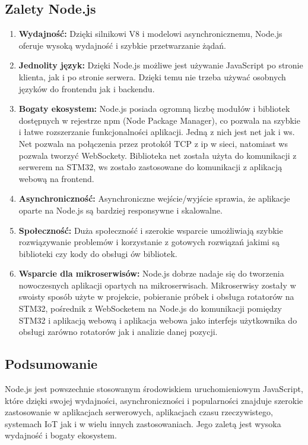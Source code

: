 \subsection{Zalety Node.js}
\begin{enumerate}
    \item \textbf{Wydajność:} Dzięki silnikowi V8 i modelowi asynchronicznemu, Node.js oferuje wysoką wydajność i szybkie przetwarzanie żądań.
    \item \textbf{Jednolity język:} Dzięki Node.js możliwe jest używanie JavaScript po stronie klienta, jak i po stronie serwera. Dzięki temu nie trzeba używać osobnych języków do frontendu jak i backendu.
    \item \textbf{Bogaty ekosystem:} Node.js posiada ogromną liczbę modułów i bibliotek dostępnych w rejestrze npm (Node Package Manager), co pozwala na szybkie i łatwe rozszerzanie funkcjonalności aplikacji. Jedną z nich jest net jak i ws. Net pozwala na połączenia przez  protokół TCP z ip w sieci, natomiast ws pozwala tworzyć WebSockety. Biblioteka net została użyta do komunikacji z serwerem na STM32, ws zostało zastosowane do komunikacji z aplikacją webową na frontend.
    \item \textbf{Asynchroniczność:} Asynchroniczne wejście/wyjście sprawia, że aplikacje oparte na Node.js są bardziej responsywne i skalowalne.
    \item \textbf{Społeczność:} Duża społeczność i szerokie wsparcie umożliwiają szybkie rozwiązywanie problemów i korzystanie z gotowych rozwiązań jakimi są biblioteki czy kody do obsługi ów bibliotek.
    \item \textbf{Wsparcie dla mikroserwisów:} Node.js dobrze nadaje się do tworzenia nowoczesnych aplikacji opartych na mikroserwisach. Mikroserwisy zostały w swoisty sposób użyte w projekcie, pobieranie próbek i obsługa rotatorów na STM32, pośrednik z WebSocketem na Node.js do komunikacji pomiędzy STM32 i aplikacją webową i aplikacja webowa jako interfejs użytkownika do obsługi zarówno rotatorów jak i analizie danej pozycji.
\end{enumerate}
\subsection{Podsumowanie}
Node.js jest powszechnie stosowanym środowiskiem uruchomieniowym JavaScript, które dzięki swojej wydajności, asynchroniczności i popularności znajduje szerokie zastosowanie w aplikacjach serwerowych, aplikacjach czasu rzeczywistego, systemach IoT jak i w wielu innych zastosowaniach. Jego zaletą jest wysoka wydajność i bogaty ekosystem.

